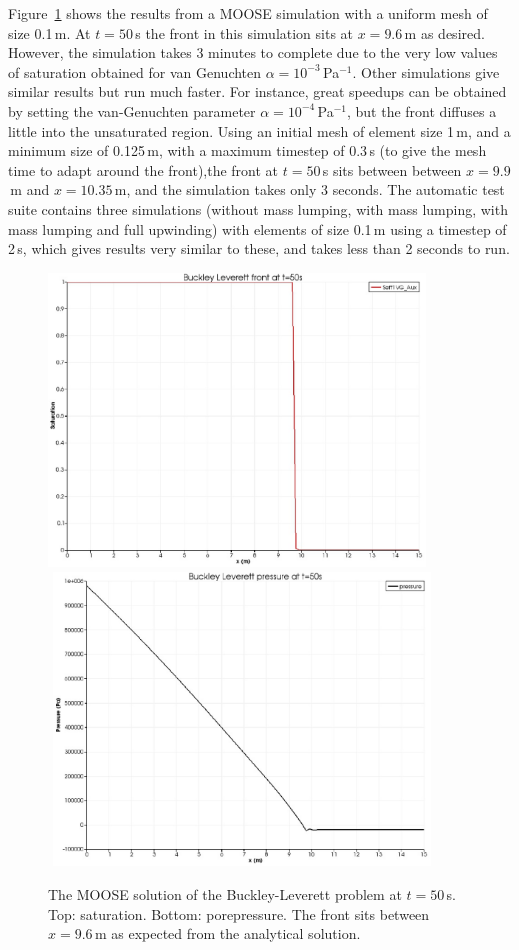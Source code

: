 \documentclass[]{scrreprt}
\begin{document}
Figure~\ref{satfront.figa} shows the results from a MOOSE simulation
with a uniform mesh of size 0.1\,m.  At $t=50$\,s the front in this
simulation sits at $x=9.6$\,m as desired.  However, the simulation
takes 3 minutes to complete due to the very low values of saturation
obtained for van Genuchten $\alpha=10^{-3}$\,Pa$^{-1}$.  Other
simulations give similar results but run much faster.  For instance,
great speedups can be obtained by setting the van-Genuchten parameter
$\alpha=10^{-4}$\,Pa$^{-1}$, but the front diffuses a little into the
unsaturated region.  Using an initial mesh of element size 1\,m, and a
minimum size of 0.125\,m, with a maximum timestep of 0.3\,s (to give
the mesh time to adapt around the front),the front at $t=50$\,s sits
between between $x=9.9$\,m and $x=10.35$\,m, and the simulation takes
only 3 seconds.  The automatic test suite contains three simulations
(without mass lumping, with mass lumping, with mass lumping and full
upwinding) with elements of size 0.1\,m using a timestep of 2\,s,
which gives results very similar to these, and takes less than 2
seconds to run.

\begin{figure}[htb]
\begin{center}
\includegraphics[width=10cm]{bl_seff.eps} \\
$\mbox{}$
\includegraphics[width=10cm]{bl_p.eps} \\
\caption{The MOOSE solution of the Buckley-Leverett problem at
  $t=50$\,s.  Top: saturation.  Bottom: porepressure.  The front sits
  between $x=9.6$\,m as expected from the analytical solution.}
\label{satfront.figa}
\end{center}
\end{figure}
\end{document}
